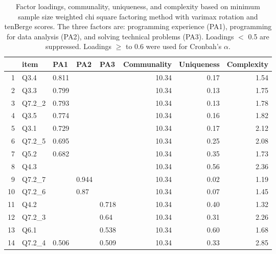 \documentclass[020-persona\_validation.tex]{subfiles}
\begin{document}
        \begin{table}[!hbtp]
            \centering
            \caption[3-factor item loadings]
            {Factor loadings, communality, uniqueness, and complexity
                based on minimum sample size weighted chi square factoring method with varimax rotation and tenBerge scores.
                The three factors are:
                programming experience (PA1),
                programming for data analysis (PA2), and
                solving technical problems (PA3).
                Loadings $<$ 0.5 are suppressed.
                Loadings $\ge$ to 0.6 were used for Cronbah's $\alpha$.
            }
            \begin{tabular}{rllllrrr}
                \hline
               & item & PA1 & PA2 & PA3 & Communality & Uniqueness & Complexity \\
                \hline
              1 & Q3.4 & 0.811 &  &  & 10.34 & 0.17 & 1.54 \\
                2 & Q3.3 & 0.799 &  &  & 10.34 & 0.13 & 1.75 \\
                3 & Q7.2\_2 & 0.793 &  &  & 10.34 & 0.13 & 1.78 \\
                4 & Q3.5 & 0.774 &  &  & 10.34 & 0.16 & 1.82 \\
                5 & Q3.1 & 0.729 &  &  & 10.34 & 0.17 & 2.12 \\
                6 & Q7.2\_5 & 0.695 &  &  & 10.34 & 0.25 & 2.08 \\
                7 & Q5.2 & 0.682 &  &  & 10.34 & 0.35 & 1.73 \\
                8 & Q4.3 &  &  &  & 10.34 & 0.56 & 2.36 \\
                9 & Q7.2\_7 &  & 0.944 &  & 10.34 & 0.02 & 1.19 \\
                10 & Q7.2\_6 &  & 0.87 &  & 10.34 & 0.07 & 1.45 \\
                11 & Q4.2 &  &  & 0.718 & 10.34 & 0.40 & 1.32 \\
                12 & Q7.2\_3 &  &  & 0.64 & 10.34 & 0.31 & 2.26 \\
                13 & Q6.1 &  &  & 0.538 & 10.34 & 0.60 & 1.68 \\
                14 & Q7.2\_4 & 0.506 &  & 0.509 & 10.34 & 0.33 & 2.85 \\
                 \hline
              \end{tabular}
            \label{tab:fa-3}
        \end{table}
\end{document}
